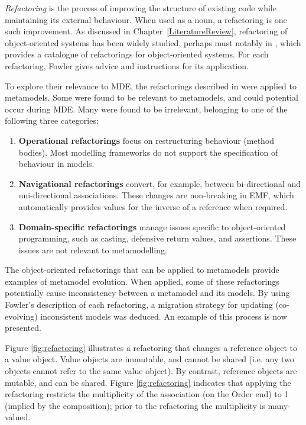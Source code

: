 \emph{Refactoring} is the process of improving the structure of existing code while maintaining its external behaviour. When used as a noun, a refactoring is one such improvement. As discussed in Chapter~\ref{LiteratureReview}, refactoring of object-oriented systems has been widely studied, perhaps must notably in \cite{fowler99refactoring}, which provides a catalogue of refactorings for object-oriented systems. For each refactoring, Fowler gives advice and instructions for its application.

To explore their relevance to MDE, the refactorings described in \cite{fowler99refactoring} were applied to metamodels. Some were found to be relevant to metamodels, and could potential occur during MDE. Many were found to be irrelevant, belonging to one of the following three categories:

\begin{enumerate}
	\item \textbf{Operational refactorings} focus on restructuring behaviour (method bodies). Most modelling frameworks do not support the specification of behaviour in models.
	\item \textbf{Navigational refactorings} convert, for example, between bi-directional and uni-directional associations. These changes are non-breaking in EMF, which automatically provides values for the inverse of a reference when required.
	\item \textbf{Domain-specific refactorings} manage issues specific to object-oriented programming, such as casting, defensive return values, and assertions. These issues are not relevant to metamodelling.
\end{enumerate}

The object-oriented refactorings that can be applied to metamodels provide examples of metamodel evolution. When applied, some of these refactorings potentially cause inconsistency between a metamodel and its models. By using Fowler's description of each refactoring, a migration strategy for updating (co-evolving) inconsistent models was deduced. An example of this process is now presented.

Figure \ref{fig:refactoring} illustrates a refactoring that changes a reference object to a value object. Value objects are immutable, and cannot be shared (i.e. any two objects cannot refer to the same value object). By contrast, reference objects are mutable, and can be shared. Figure \ref{fig:refactoring} indicates that applying the refactoring restricts the multiplicity of the association (on the Order end) to 1 (implied by the composition); prior to the refactoring the multiplicity is many-valued.


